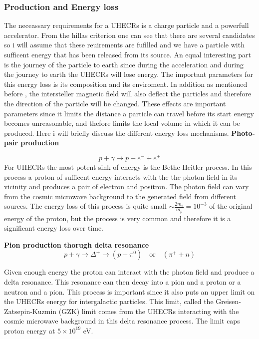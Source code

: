 \documentclass{article}
\begin{document}
\subsubsection{Production and Energy loss}
The neceassary requirements for a UHECRs is a charge particle and a powerfull accelerator. From the hillas criterion one can see that there are several candidates so i will assume that these reuirements are fufilled and we have a particle with sufficent energy that has been released from its source.
An equal interesting part is the journey of the particle to earth since during the acceleration and during the journey to earth the UHECRs will lose energy. The important parameters for this energy loss is its  composition  and its enviroment. In addition as mentioned before
, the intersteller magnetic field will also deflect the particles and therefore the direction of the particle will be changed. These effects are important parameters since it limits the 
distance a particle can travel before its start energy becomes unreasonable, and thefore limits the local volume in which it can be produced. 
Here i will briefly discuss the different energy loss mechanisms. 
\textbf{Photo-pair production}

\begin{equation}
    p + \gamma \rightarrow p + e^- + e^+
\end{equation}
For UHECRs the most potent sink of energy is the Bethe-Heitler process. In this process a proton of sufficent energy interacts with the 
the photon field in its vicinity and produces a pair of electron and positron. The photon field can vary from the cosmic microwave background to the generated field from different sources. 
The energy loss of this process is quite small $\sim \frac{2m_e}{m_p}= 10^{-3}$ of the original energy of the proton, but the process is very common and therefore it is a significant energy loss over time.


\textbf{Pion production thorugh delta resonance}
\begin{equation}
    p + \gamma \rightarrow \Delta^+ \rightarrow (p + \pi^0)\quad \text{or} \quad (\pi^+ + n)
    \label{eq:delta_resonance}
\end{equation}

Given enough energy the proton can interact with the photon field and produce a delta resonance. This resonance can then decay into a pion and a proton or a neutron and a pion. 
This process is important since it also puts an upper limit on the UHECRs energy for intergalactic particles. 
This limit, called the Greisen-Zatsepin-Kuzmin (GZK) limit comes from the UHECRs interacting with the cosmic microwave background in this delta resonance process. The limit caps proton energy at $5\times 10^{19}$ eV.
\end{document}
